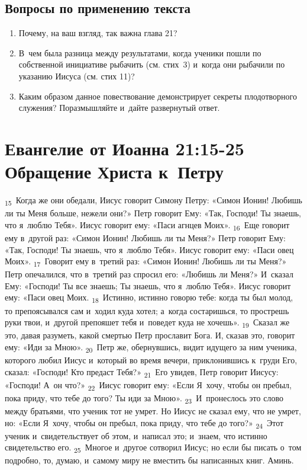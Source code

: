 \documentclass[a4paper,12pt]{article}
\begin{document}
\subsection*{Вопросы по применению текста} 
\begin{enumerate}
    \item Почему, на ваш взгляд, так важна глава 21? 
    
    \myline
    
    \myline
    \item В~чем была разница между результатами, когда ученики пошли по собственной инициативе рыбачить (см. стих~3) и~когда они рыбачили по указанию Иисуса (см. стих 11)? 
    
    \myline
    
    \myline
    \item Каким образом данное повествование демонстрирует секреты плодотворного служения? Поразмышляйте и~дайте развернутый ответ.
    
    \myline
    
    \myline
\end{enumerate}



\section{Евангелие от Иоанна 21:15-25 Обращение Христа к~Петру}

 \textsubscript{15}~Когда же они обедали, Иисус говорит Симону Петру: «Симон Ионин! Любишь ли ты Меня больше, нежели они?» Петр говорит Ему: «Так, Господи! Ты знаешь, что я~люблю Тебя». Иисус говорит ему: «Паси агнцев Моих». \textsubscript{16}~Еще говорит ему в~другой раз: «Симон Ионин! Любишь ли ты Меня?» Петр говорит Ему: «Так, Господи! Ты знаешь, что я~люблю Тебя». Иисус говорит ему: «Паси овец Моих». \textsubscript{17}~Говорит ему в~третий раз: «Симон Ионин! Любишь ли ты Меня?» Петр опечалился, что в~третий раз спросил его: «Любишь ли Меня?» И~сказал Ему: «Господи! Ты все знаешь; Ты знаешь, что я~люблю Тебя». Иисус говорит ему: «Паси овец Моих. \textsubscript{18}~Истинно, истинно говорю тебе: когда ты был молод, то препоясывался сам и~ходил куда хотел; а~когда состаришься, то прострешь руки твои, и~другой препояшет тебя и~поведет куда не хочешь». \textsubscript{19}~Сказал же это, давая разуметь, какой смертью Петр прославит Бога. И, сказав это, говорит ему: «Иди за Мною». \textsubscript{20}~Петр же, обернувшись, видит идущего за ним ученика, которого любил Иисус и~который во время вечери, приклонившись к~груди Его, сказал: «Господи! Кто предаст Тебя?» \textsubscript{21}~Его увидев, Петр говорит Иисусу: «Господи! А~он что?» \textsubscript{22}~Иисус говорит ему: «Если Я~хочу, чтобы он пребыл, пока приду, что тебе до того? Ты иди за Мною». \textsubscript{23}~И~пронеслось это слово между братьями, что ученик тот не умрет. Но Иисус не сказал ему, что не умрет, но: «Если Я~хочу, чтобы он пребыл, пока приду, что тебе до того?» \textsubscript{24}~Этот ученик и~свидетельствует об этом, и~написал это; и~знаем, что истинно свидетельство его. \textsubscript{25}~Многое и~другое сотворил Иисус; но если бы писать о~том подробно, то, думаю, и~самому миру не вместить бы написанных книг. Аминь. 
\end{document}
